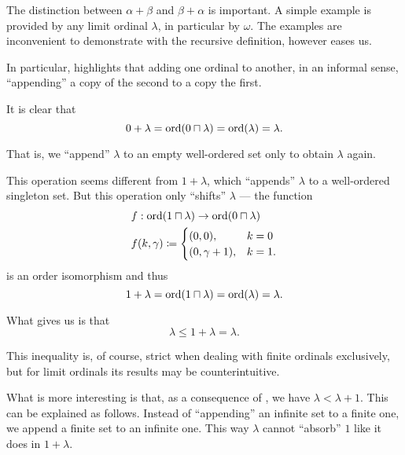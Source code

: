 \begin{example}\label{ex:ordinal_addition}
  The distinction between \( \alpha + \beta \) and \( \beta + \alpha \) is important. A simple example is provided by any limit ordinal \( \lambda \), in particular by \( \omega \). The examples are inconvenient to demonstrate with the recursive definition, however  eases us.

  In particular,  highlights that adding one ordinal to another, in an informal sense, \enquote{appending} a copy of the second to a copy the first.

  It is clear that
  \begin{equation*}
    0 + \lambda = \operatorname{ord}(0 \sqcap \lambda) = \operatorname{ord}(\lambda) = \lambda.
  \end{equation*}

  That is, we \enquote{append} \( \lambda \) to an empty well-ordered set only to obtain \( \lambda \) again.

  This operation seems different from \( 1 + \lambda \), which \enquote{appends} \( \lambda \) to a well-ordered singleton set. But this operation only \enquote{shifts} \( \lambda \) --- the function
  \begin{equation*}
    \begin{aligned}
      &f: \operatorname{ord}(1 \sqcap \lambda) \to \operatorname{ord}(0 \sqcap \lambda) \\
      &f(k, \gamma) \coloneqq \begin{cases}
        (0, 0),          &k = 0 \\
        (0, \gamma + 1), &k = 1.
      \end{cases}
    \end{aligned}
  \end{equation*}
  is an order isomorphism and thus
  \begin{equation*}
    1 + \lambda = \operatorname{ord}(1 \sqcap \lambda) = \operatorname{ord}(\lambda) = \lambda.
  \end{equation*}

  What  gives us is that
  \begin{equation*}
    \lambda \leq 1 + \lambda = \lambda.
  \end{equation*}

  This inequality is, of course, strict when dealing with finite ordinals exclusively, but for limit ordinals its results may be counterintuitive.

  What is more interesting is that, as a consequence of , we have \( \lambda < \lambda + 1 \). This can be explained as follows. Instead of \enquote{appending} an infinite set to a finite one, we append a finite set to an infinite one. This way \( \lambda \) cannot \enquote{absorb} \( 1 \) like it does in \( 1 + \lambda \).


\end{example}

